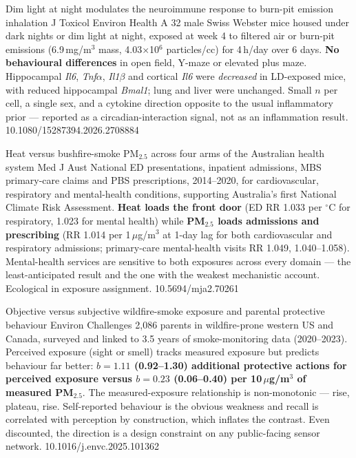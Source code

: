 \documentclass[10pt]{article}
\begin{document}
{Dim light at night modulates the neuroimmune response to burn-pit emission inhalation}
{J Toxicol Environ Health A}
{32 male Swiss Webster mice housed under dark nights or dim light at night, exposed at
week 4 to filtered air or burn-pit emissions (6.9\,mg/m$^3$ mass,
4.03$\times$10$^6$ particles/cc) for 4\,h/day over 6 days. \textbf{No behavioural
differences} in open field, Y-maze or elevated plus maze. Hippocampal \textit{Il6},
\textit{Tnf}$\alpha$, \textit{Il1}$\beta$ and cortical \textit{Il6} were
\emph{decreased} in LD-exposed mice, with reduced hippocampal \textit{Bmal1}; lung and
liver were unchanged. Small $n$ per cell, a single sex, and a cytokine direction opposite
to the usual inflammatory prior --- reported as a circadian-interaction signal, not as an
inflammation result.}
{10.1080/15287394.2026.2708884}

\clearpage


{Heat versus bushfire-smoke PM$_{2.5}$ across four arms of the Australian health system}
{Med J Aust}
{National ED presentations, inpatient admissions, MBS primary-care claims and PBS
prescriptions, 2014--2020, for cardiovascular, respiratory and mental-health conditions,
supporting Australia's first National Climate Risk Assessment. \textbf{Heat loads the
front door} (ED RR 1.033 per $^{\circ}$C for respiratory, 1.023 for mental health) while
\textbf{PM$_{2.5}$ loads admissions and prescribing} (RR 1.014 per 1\,$\mu$g/m$^3$ at
1-day lag for both cardiovascular and respiratory admissions; primary-care mental-health
visits RR 1.049, 1.040--1.058). Mental-health services are sensitive to both exposures
across every domain --- the least-anticipated result and the one with the weakest
mechanistic account. Ecological in exposure assignment.}
{10.5694/mja2.70261}

{Objective versus subjective wildfire-smoke exposure and parental protective behaviour}
{Environ Challenges}
{2{,}086 parents in wildfire-prone western US and Canada, surveyed and linked to 3.5 years
of smoke-monitoring data (2020--2023). Perceived exposure (sight or smell) tracks measured
exposure but predicts behaviour far better: \textbf{$b=1.11$ (0.92--1.30) additional
protective actions for perceived exposure versus $b=0.23$ (0.06--0.40) per
10\,$\mu$g/m$^3$ of measured PM$_{2.5}$}. The measured-exposure relationship is
non-monotonic --- rise, plateau, rise. Self-reported behaviour is the obvious weakness and
recall is correlated with perception by construction, which inflates the contrast. Even
discounted, the direction is a design constraint on any public-facing sensor network.}
{10.1016/j.envc.2025.101362}
\end{document}
